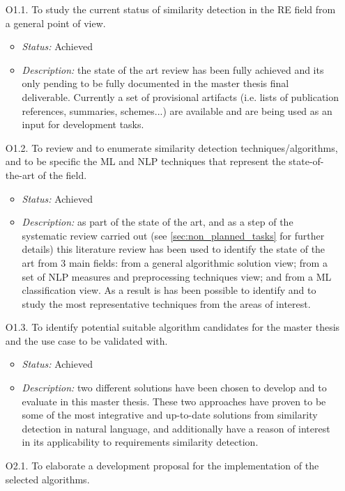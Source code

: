 \documentclass[11pt]{article}
\begin{document}
\begin{enumerate}
\item[O1.1.] To study the current status of similarity detection in the RE field from a general point of view.
\begin{itemize}
\item \textit{Status:} Achieved
\item \textit{Description:} the state of the art review has been fully achieved and its only pending to be fully documented in the master thesis final deliverable. Currently a set of provisional artifacts (i.e. lists of publication references, summaries, schemes...) are available and are being used as an input for development tasks.
\end{itemize}
\item[O1.2.] To review and to enumerate similarity detection techniques/algorithms, and to be specific the ML and NLP techniques that represent the state-of-the-art of the field.
\begin{itemize}
\item \textit{Status:} Achieved
\item \textit{Description:} as part of the state of the art, and as a step of the systematic review carried out (see \ref{sec:non_planned_tasks} for further details) this literature review has been used to identify the state of the art from 3 main fields: from a general algorithmic solution view; from a set of NLP measures and preprocessing techniques view; and from a ML classification view. As a result is has been possible to identify and to study the most representative techniques from the areas of interest.
\end{itemize}
\item[O1.3.] To identify potential suitable algorithm candidates for the master thesis and the use case to be validated with.
\begin{itemize}
\item \textit{Status:} Achieved
\item \textit{Description:} two different solutions have been chosen to develop and to evaluate in this master thesis. These two approaches have proven to be some of the most integrative and up-to-date solutions from similarity detection in natural language, and additionally have a reason of interest in its applicability to requirements similarity detection.
\end{itemize}
\item[O2.1.] To elaborate a development proposal for the implementation of the selected algorithms.

\end{enumerate}
\end{document}
